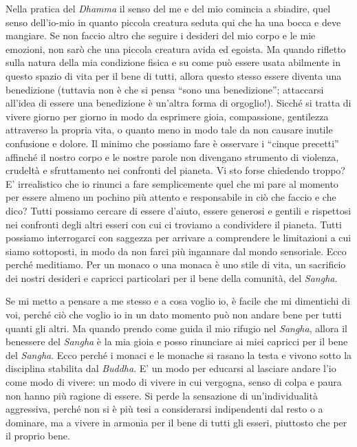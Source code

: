 Nella pratica del \textit{Dhamma} il senso del me e del mio comincia a sbiadire,
quel senso dell'io-mio in quanto piccola creatura seduta qui che ha una
bocca e deve mangiare. Se non faccio altro che seguire i desideri del
mio corpo e le mie emozioni, non sarò che una piccola creatura avida ed
egoista. Ma quando rifletto sulla natura della mia condizione fisica e
su come può essere usata abilmente in questo spazio di vita per il bene
di tutti, allora questo stesso essere diventa una benedizione (tuttavia
non è che si pensa ``sono una benedizione''; attaccarsi all'idea di essere
una benedizione è un'altra forma di orgoglio!). Sicché si tratta di
vivere giorno per giorno in modo da esprimere gioia, compassione,
gentilezza attraverso la propria vita, o quanto meno in modo tale da non
causare inutile confusione e dolore. Il minimo che possiamo fare è
osservare i ``cinque precetti'' affinché il nostro corpo e le
nostre parole non divengano strumento di violenza, crudeltà e
sfruttamento nei confronti del pianeta. Vi sto forse chiedendo troppo?
E' irrealistico che io rinunci a fare semplicemente quel che mi pare al
momento per essere almeno un pochino più attento e responsabile in ciò
che faccio e che dico? Tutti possiamo cercare di essere d'aiuto, essere
generosi e gentili e rispettosi nei confronti degli altri esseri con cui
ci troviamo a condividere il pianeta. Tutti possiamo interrogarci con
saggezza per arrivare a comprendere le limitazioni a cui siamo
sottoposti, in modo da non farci più ingannare dal mondo sensoriale.
Ecco perché meditiamo. Per un monaco o una monaca è uno stile di vita,
un sacrificio dei nostri desideri e capricci particolari per il bene
della comunità, del \textit{Sangha}.

Se mi metto a pensare a me stesso e a cosa voglio io, è facile che mi
dimentichi di voi, perché ciò che voglio io in un dato momento può non
andare bene per tutti quanti gli altri. Ma quando prendo come guida il
mio rifugio nel \textit{Sangha}, allora il benessere del \textit{Sangha} è la mia gioia e
posso rinunciare ai miei capricci per il bene del \textit{Sangha}. Ecco perché i
monaci e le monache si rasano la testa e vivono sotto la disciplina
stabilita dal \textit{Buddha}. E' un modo per educarsi al lasciare andare l'io
come modo di vivere: un modo di vivere in cui vergogna, senso di colpa e
paura non hanno più ragione di essere. Si perde la sensazione di
un'individualità aggressiva, perché non si è più tesi a considerarsi
indipendenti dal resto o a dominare, ma a vivere in armonia per il bene
di tutti gli esseri, piuttosto che per il proprio bene.

